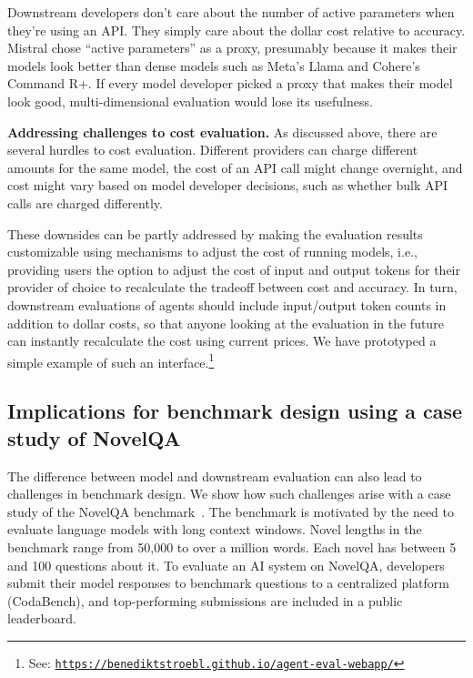\documentclass{article}
\begin{document}
Downstream developers don't care about the number of active parameters when they're using an API. They simply care about the dollar cost relative to accuracy. Mistral chose ``active parameters'' as a proxy, presumably because it makes their models look better than dense models such as Meta’s Llama and Cohere’s Command R+. If every model developer picked a proxy that makes their model look good, multi-dimensional evaluation would lose its usefulness.


\textbf{Addressing challenges to cost evaluation.}
As discussed above, there are several hurdles to cost evaluation. Different providers can charge different amounts for the same model, the cost of an API call might change overnight, and cost might vary based on model developer decisions, such as whether bulk API calls are charged differently. 

These downsides can be partly addressed by making the evaluation results customizable using mechanisms to adjust the cost of running models, i.e., providing users the option to adjust the cost of input and output tokens for their provider of choice to recalculate the tradeoff between cost and accuracy. In turn, downstream evaluations of agents should include input/output token counts in addition to dollar costs, so that anyone looking at the evaluation in the future can instantly recalculate the cost using current prices. We have prototyped a simple example of such an interface.\footnote{See: \texttt{\url{https://benediktstroebl.github.io/agent-eval-webapp/}}} 

\subsection{Implications for benchmark design using a case study of NovelQA}
\label{sec:novelqa-casestudy}

The difference between model and downstream evaluation can also lead to challenges in benchmark design. We show how such challenges arise with a case study of the NovelQA benchmark~\citep{wang_novelqa_2024}. 
The benchmark is motivated by the need to evaluate language models with long context windows. Novel lengths in the benchmark range from 50,000 to over a million words. Each novel has between 5 and 100 questions about it.
To evaluate an AI system on NovelQA, developers submit their model responses to benchmark questions to a centralized platform (CodaBench), and top-performing submissions are included in a public leaderboard. 
\end{document}
